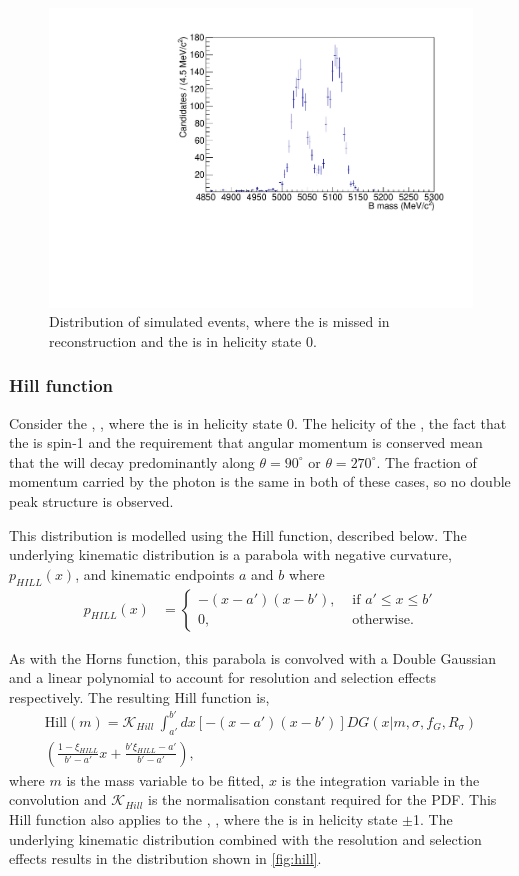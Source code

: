 \begin{figure}[h]
\centering
\includegraphics[width=0.5\linewidth]{figures/fitComponents/horns.pdf}
\caption{Distribution of simulated \decay{\Bm}{(\decay{\Dstarz}{\Dz\piz})\Kstarm} events, where the \piz is missed in reconstruction and the \Dstarz is in helicity state 0.}
\label{fig:horns}
\end{figure}

\subsubsection{Hill function}

Consider the \decay{\Bm}{\Dstarz\Kstarm}, \decay{\Dstarz}{\Dz\gamma}, where the \Dstarz is in helicity state 0. The helicity of the \Dstarz, the fact that the \Pgamma is spin-1 and the requirement that angular momentum is conserved mean that the \Pgamma will decay predominantly along $\theta = 90^{\circ}$ or $\theta = 270^{\circ}$. The fraction of momentum carried by the photon is the same in both of these cases, so no double peak structure is observed.

This distribution is modelled using the Hill function, described below. The underlying kinematic distribution is a parabola with negative curvature, $p_{HILL}(x)$, and kinematic endpoints $a$ and $b$ where
\begin{align}
p_{HILL}(x) &= \begin{cases}
-(x - a')(x - b'), & \text{ if $a' \leq x \leq b'$}\\ 	
0, & \text{ otherwise.}
\end{cases} 
\end{align}

As with the Horns function, this parabola is convolved with a Double Gaussian and a linear polynomial to account for resolution and selection effects respectively. The resulting Hill function is,
\begin{multline}
\text{Hill}(m) = \mathcal{K}_{Hill}\ \int_{a'}^{b'} dx \left[-(x - a')(x - b')\right] DG(x|m,\sigma,f_G,R_{\sigma}) \\
\left( \frac{1 - \xi_{HILL}}{b' - a'}x + \frac{b'\xi_{HILL} - a'}{b' - a'}\right),
\label{eqn:hill}
\end{multline}
where $m$ is the mass variable to be fitted, $x$ is the integration variable in the convolution and $\mathcal{K}_{Hill}$ is the normalisation constant required for the PDF. This Hill function also applies to the \decay{\Bm}{\Dstarz\Kstarm}, \decay{\Dstarz}{\Dz\piz}, where the \Dstarz is in helicity state $\pm$1. The underlying kinematic distribution combined with the resolution and selection effects results in the distribution shown in \fig\ref{fig:hill}.

